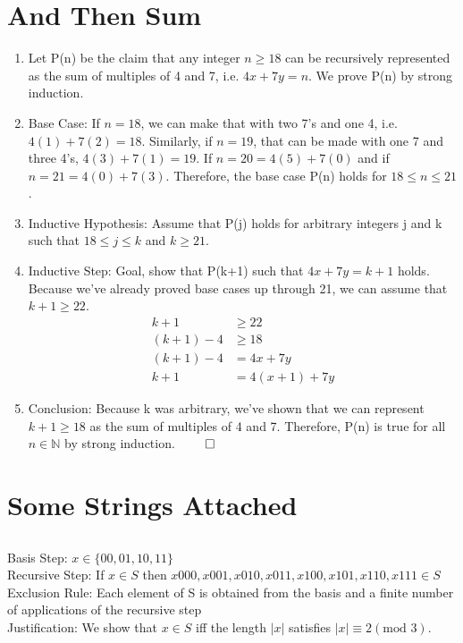 \documentclass[11pt]{article}
\newcommand{\N}{\mathbb{N}}
\begin{document}
\section{And Then Sum} %
\begin{enumerate}
	\item Let P(n) be the claim that any integer $n \geq 18$ can be recursively represented as the sum of multiples of 4 and 7, i.e. $4x + 7y = n$. We prove P(n) by strong induction.
	\item Base Case: If $n = 18$, we can make that with two 7's and one 4, i.e. $4(1) + 7(2) = 18$. Similarly, if $n = 19$, that can be made with one 7 and three 4's, $4(3) + 7(1) = 19$. If $n = 20 = 4(5) + 7(0)$ and if $n = 21 = 4(0) + 7(3)$. Therefore, the base case P(n) holds for $18 \leq n \leq 21$. 
	\item Inductive Hypothesis: Assume that P(j) holds for arbitrary integers j and k such that $18 \leq j \leq k$ and $k \geq 21$.
	\item Inductive Step: Goal, show that P(k+1) such that $4x + 7y = k+1$ holds. 
	\\Because we've already proved base cases up through 21, we can assume that $k+1\geq 22$. 
	\begin{align*}
		k + 1 &\geq 22 \\
		(k + 1) - 4 &\geq 18 \\
		(k + 1) - 4 &= 4x + 7y \tag*{Inductive Hypothesis} \\
		k + 1 &= 4(x + 1) + 7y
	\end{align*}
	\item Conclusion: Because k was arbitrary, we've shown that we can represent $k+1\geq 18$ as the sum of multiples of 4 and 7. Therefore, P(n) is true for all $n \in \N$ by strong induction. $\qed$
\end{enumerate}

\section{Some Strings Attached} %
\subsection{} %
Basis Step: $x \in \{00, 01, 10, 11\}$ \\
Recursive Step: If $x \in S$ then $x000, x001, x010, x011, x100, x101, x110, x111 \in S$ \\
Exclusion Rule: Each element of S is obtained from the basis and a finite number of applications of the recursive step\\
Justification: We show that $x \in S$ iff the length $|x|$ satisfies $|x| \equiv 2 (\text{mod } 3)$. \\
\end{document}

